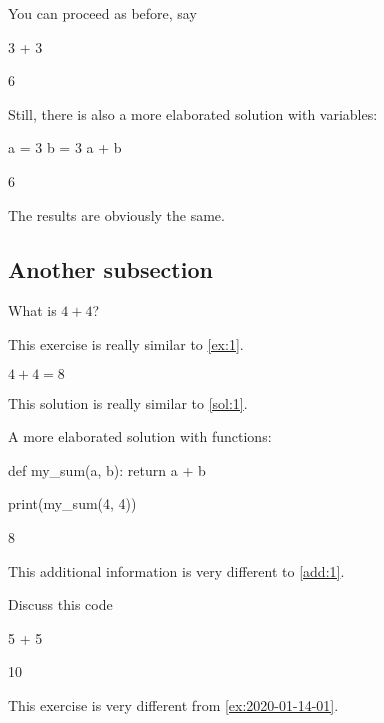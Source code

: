 \documentclass{book}
\begin{document}
\begin{additionalinformation}
You can proceed as before, say
\begin{pycell}
3 + 3
\end{pycell}
\begin{pyexpectedoutput}
6
\end{pyexpectedoutput}

Still, there is also a more elaborated solution with variables:

\begin{pycell}
a = 3
b = 3
a + b
\end{pycell}
\begin{pyexpectedoutput}
6
\end{pyexpectedoutput}

The results are obviously the same.
\end{additionalinformation}

\subsection{Another subsection}

\begin{exercise}
  What is \(4 + 4\)?

  This exercise is really similar to \cref{ex:1}.
\end{exercise}

\begin{solution}
  \(4 + 4 = 8\)

  This solution is really similar to \cref{sol:1}.
\end{solution}

\begin{additionalinformation}
A more elaborated solution with functions:

\begin{pycell}
def my_sum(a, b):
    return a + b

print(my_sum(4, 4))
\end{pycell}
\begin{pyexpectedoutput}
8
\end{pyexpectedoutput}

This additional information is very different to \cref{add:1}.
\end{additionalinformation}

\begin{exercise}[examdate={January 15, 2020}, examproblemnumber={1}, examproblemid={2020-01-15-01}]
Discuss this code

\begin{pycell}
5 + 5
\end{pycell}
\begin{pyexpectedoutput}
10
\end{pyexpectedoutput}

This exercise is very different from \cref{ex:2020-01-14-01}.
\end{exercise}
\end{document}
